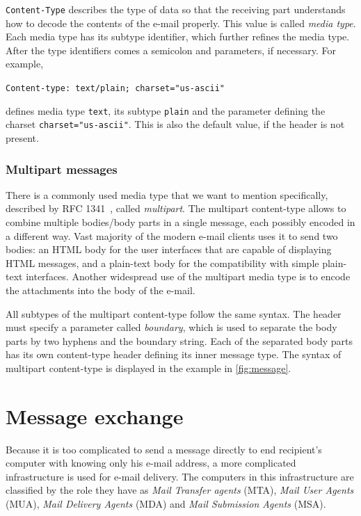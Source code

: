 \texttt{Content-Type} describes the type of data so that the receiving part understands how to decode the contents of the e-mail properly. This value is called \emph{media type}. Each media type has its subtype identifier, which further refines the media type. After the type identifiers comes a semicolon and parameters, if necessary. For example,
\begin{center}
\texttt{Content-type: text/plain; charset="us-ascii"}
\end{center}
defines media type \texttt{text}, its subtype \texttt{plain} and the parameter defining the charset \texttt{charset="us-ascii"}. This is also the default value, if the header is not present.

\subsubsection{Multipart messages}
There is a commonly used media type that we want to mention specifically, described by RFC 1341~\cite{rfc1341}, called \emph{multipart}.
The multipart content-type allows to combine multiple bodies/body parts in a single message, each possibly encoded in a different way. Vast majority of the modern e-mail clients uses it to send two bodies: an HTML body for the user interfaces that are capable of displaying HTML messages, and a plain-text body for the compatibility with simple plain-text interfaces.
Another widespread use of the multipart media type is to encode the attachments into the body of the e-mail.

All subtypes of the multipart content-type follow the same syntax. The header must specify a parameter called \emph{boundary}, which is used to separate the body parts by two hyphens and the boundary string. Each of the separated body parts has its own content-type header defining its inner message type. The syntax of multipart content-type is displayed in the example in \autoref{fig:message}.

\section{Message exchange}
Because it is too complicated to send a message directly to end recipient's computer with knowing only his e-mail address, a more complicated infrastructure is used for e-mail delivery. 
The computers in this infrastructure are classified by the role they have as \emph{Mail Transfer agents} (MTA), \emph{Mail User Agents} (MUA), \emph{Mail Delivery Agents} (MDA) and \emph{Mail Submission Agents} (MSA).

